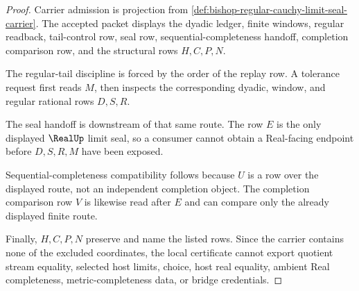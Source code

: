\begin{proof}
Carrier admission is projection from \autoref{def:bishop-regular-cauchy-limit-seal-carrier}. The accepted packet displays the dyadic ledger, finite windows, regular readback, tail-control row, seal row, sequential-completeness handoff, completion comparison row, and the structural rows $H,C,P,N$.

The regular-tail discipline is forced by the order of the replay row. A tolerance request first reads $M$, then inspects the corresponding dyadic, window, and regular rational rows $D,S,R$.

The seal handoff is downstream of that same route. The row $E$ is the only displayed $\RealUp$ limit seal, so a consumer cannot obtain a Real-facing endpoint before $D,S,R,M$ have been exposed.

Sequential-completeness compatibility follows because $U$ is a row over the displayed route, not an independent completion object. The completion comparison row $V$ is likewise read after $E$ and can compare only the already displayed finite route.

Finally, $H,C,P,N$ preserve and name the listed rows. Since the carrier contains none of the excluded coordinates, the local certificate cannot export quotient stream equality, selected host limits, choice, host real equality, ambient Real completeness, metric-completeness data, or bridge credentials.
\end{proof}

